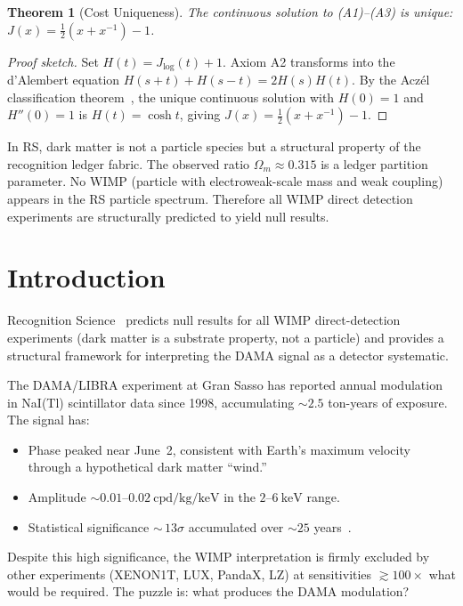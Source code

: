 \documentclass[12pt,a4paper]{article}
\newtheorem{theorem}{Theorem}[section]
\theoremstyle{definition}
\theoremstyle{remark}
\begin{document}
\begin{theorem}[Cost Uniqueness]
\label{thm:unique}
The continuous solution to \textup{(A1)--(A3)} is unique:
$J(x) = \tfrac{1}{2}(x + x^{-1}) - 1$.
\end{theorem}

\begin{proof}[Proof sketch]
Set $H(t) = J_{\log}(t)+1$.  Axiom A2 transforms into the d'Alembert
equation $H(s+t)+H(s-t)=2H(s)H(t)$.  By the Acz\'el classification
theorem~\cite{Aczel1966}, the unique continuous solution with $H(0)=1$
and $H''(0)=1$ is $H(t)=\cosh t$, giving
$J(x)=\tfrac{1}{2}(x+x^{-1})-1$.
\end{proof}

\noindent In RS, dark matter is not a particle species but a structural
property of the recognition ledger fabric.  The observed ratio
$\Omega_m \approx 0.315$ is a ledger partition parameter.  No WIMP
(particle with electroweak-scale mass and weak coupling) appears in the
RS particle spectrum.  Therefore all WIMP direct detection experiments
are structurally predicted to yield null results.

\section{Introduction}
\label{sec:intro}

Recognition Science~\cite{RS_Axioms} predicts null results for
all WIMP direct-detection experiments (dark matter is a substrate
property, not a particle) and provides a structural framework
for interpreting the DAMA signal as a detector systematic.

The DAMA/LIBRA experiment at Gran Sasso has reported annual modulation
in NaI(Tl) scintillator data since 1998, accumulating $\sim 2.5$
ton-years of exposure.  The signal has:
\begin{itemize}[nosep]
  \item Phase peaked near June~2, consistent with Earth's maximum
  velocity through a hypothetical dark matter ``wind.''
  \item Amplitude $\sim 0.01$--$0.02~\mathrm{cpd/kg/keV}$ in the
  $2$--$6~\mathrm{keV}$ range.
  \item Statistical significance ${\sim}\,13\sigma$ accumulated over
  $\sim 25$ years~\cite{DAMA2018}.
\end{itemize}

Despite this high significance, the WIMP interpretation is firmly
excluded by other experiments (XENON1T, LUX, PandaX, LZ) at
sensitivities $\gtrsim 100\times$ what would be required.  The puzzle
is: what produces the DAMA modulation?
\end{document}
